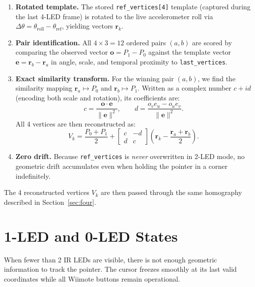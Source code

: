 \documentclass[11pt,a4paper]{article}
\newcommand{\vect}[1]{\mathbf{#1}}
\newcommand{\norm}[1]{\lVert #1 \rVert}
\newcommand{\code}[1]{\texttt{#1}}
\begin{document}
\begin{enumerate}
  \item \textbf{Rotated template.} The stored \code{ref\_vertices[4]} template
        (captured during the last 4-LED frame) is rotated to the live
        accelerometer roll via $\Delta\theta = \theta_{\text{roll}} -
        \theta_{\text{ref}}$, yielding vectors $\vect{r}_k$.
  \item \textbf{Pair identification.} All $4\times 3 = 12$ ordered pairs
        $(a,b)$ are scored by comparing the observed vector
        $\vect{o} = P_1 - P_0$ against the template vector
        $\vect{e} = \vect{r}_b - \vect{r}_a$ in angle, scale, and temporal
        proximity to \code{last\_vertices}.
  \item \textbf{Exact similarity transform.} For the winning pair $(a,b)$, we
        find the similarity mapping $\vect{r}_a \mapsto P_0$ and
        $\vect{r}_b \mapsto P_1$. Written as a complex number $c + i d$
        (encoding both scale and rotation), its coefficients are:
        \begin{equation}
          c = \frac{\vect{o}\cdot\vect{e}}{\norm{\vect{e}}^2}, \qquad
          d = \frac{o_v e_u - o_u e_v}{\norm{\vect{e}}^2}.
        \end{equation}
        All 4 vertices are then reconstructed as:
        \begin{equation}
          V_k = \frac{P_0 + P_1}{2} +
          \begin{bmatrix} c & -d \\ d & c \end{bmatrix}
          \left(\vect{r}_k - \frac{\vect{r}_a + \vect{r}_b}{2}\right).
        \end{equation}
  \item \textbf{Zero drift.} Because \code{ref\_vertices} is \emph{never}
        overwritten in 2-LED mode, no geometric drift accumulates even when
        holding the pointer in a corner indefinitely.
\end{enumerate}

The 4 reconstructed vertices $V_k$ are then passed through the same homography
described in Section~\ref{sec:four}.

\section{1-LED and 0-LED States}

When fewer than 2 IR LEDs are visible, there is not enough geometric
information to track the pointer. The cursor freezes smoothly at its last valid
coordinates while all Wiimote buttons remain operational.
\end{document}
